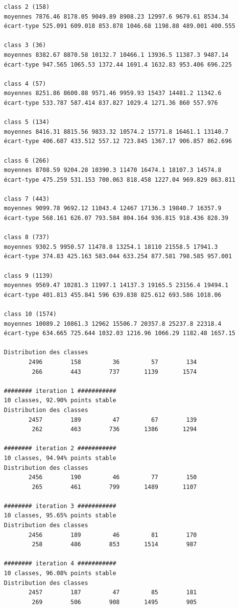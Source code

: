 \documentclass[land,article,submit,pdftex,moreauthors]{Definitions/mdpi}
\begin{document}
\begin{scriptsize}
\begin{verbatim}
class 2 (158)
moyennes 7876.46 8178.05 9049.89 8908.23 12997.6 9679.61 8534.34
écart-type 525.091 609.018 853.878 1046.68 1198.88 489.001 400.555

class 3 (36)
moyennes 8382.67 8870.58 10132.7 10466.1 13936.5 11387.3 9487.14
écart-type 947.565 1065.53 1372.44 1691.4 1632.83 953.406 696.225

class 4 (57)
moyennes 8251.86 8600.88 9571.46 9959.93 15437 14481.2 11342.6
écart-type 533.787 587.414 837.827 1029.4 1271.36 860 557.976

class 5 (134)
moyennes 8416.31 8815.56 9833.32 10574.2 15771.8 16461.1 13140.7
écart-type 406.687 433.512 557.12 723.845 1367.17 906.857 862.696

class 6 (266)
moyennes 8708.59 9204.28 10390.3 11470 16474.1 18107.3 14574.8
écart-type 475.259 531.153 700.063 818.458 1227.04 969.829 863.811

class 7 (443)
moyennes 9099.78 9692.12 11043.4 12467 17136.3 19840.7 16357.9
écart-type 568.161 626.07 793.584 804.164 936.815 918.436 828.39

class 8 (737)
moyennes 9302.5 9950.57 11478.8 13254.1 18110 21558.5 17941.3
écart-type 374.83 425.163 583.044 633.254 877.581 798.585 957.001

class 9 (1139)
moyennes 9569.47 10281.3 11997.1 14137.3 19165.5 23156.4 19494.1
écart-type 401.813 455.841 596 639.838 825.612 693.586 1018.06

class 10 (1574)
moyennes 10089.2 10861.3 12962 15506.7 20357.8 25237.8 22318.4
écart-type 634.665 725.644 1032.03 1216.96 1066.29 1182.48 1657.15

Distribution des classes
       2496        158         36         57        134
        266        443        737       1139       1574

######## iteration 1 ###########
10 classes, 92.90% points stable
Distribution des classes
       2457        189         47         67        139
        262        463        736       1386       1294

######## iteration 2 ###########
10 classes, 94.94% points stable
Distribution des classes
       2456        190         46         77        150
        265        461        799       1489       1107

######## iteration 3 ###########
10 classes, 95.65% points stable
Distribution des classes
       2456        189         46         81        170
        258        486        853       1514        987

######## iteration 4 ###########
10 classes, 96.08% points stable
Distribution des classes
       2457        187         47         85        181
        269        506        908       1495        905


\end{verbatim}
\end{scriptsize}
\end{document}
